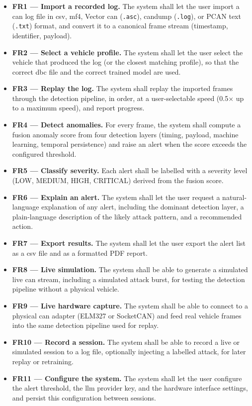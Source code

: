\begin{itemize}
    \item \textbf{FR1 — Import a recorded log.} The system shall let the user import a \gls{can} log file in \gls{csv}, \gls{mf4}, Vector \gls{can} (\texttt{.asc}), candump (\texttt{.log}), or PCAN text (\texttt{.txt}) format, and convert it to a canonical frame stream (timestamp, identifier, payload).
    \item \textbf{FR2 — Select a vehicle profile.} The system shall let the user select the vehicle that produced the log (or the closest matching profile), so that the correct \gls{dbc} file and the correct trained model are used.
    \item \textbf{FR3 — Replay the log.} The system shall replay the imported frames through the detection pipeline, in order, at a user-selectable speed (0.5$\times$ up to a maximum speed), and report progress.
    \item \textbf{FR4 — Detect anomalies.} For every frame, the system shall compute a fusion anomaly score from four detection layers (timing, payload, machine learning, temporal persistence) and raise an alert when the score exceeds the configured threshold.
    \item \textbf{FR5 — Classify severity.} Each alert shall be labelled with a severity level (LOW, MEDIUM, HIGH, CRITICAL) derived from the fusion score.
    \item \textbf{FR6 — Explain an alert.} The system shall let the user request a natural-language explanation of any alert, including the dominant detection layer, a plain-language description of the likely attack pattern, and a recommended action.
    \item \textbf{FR7 — Export results.} The system shall let the user export the alert list as a \gls{csv} file and as a formatted PDF report.
    \item \textbf{FR8 — Live simulation.} The system shall be able to generate a simulated live \gls{can} stream, including a simulated attack burst, for testing the detection pipeline without a physical vehicle.
    \item \textbf{FR9 — Live hardware capture.} The system shall be able to connect to a physical \gls{can} adapter (ELM327 or SocketCAN) and feed real vehicle frames into the same detection pipeline used for replay.
    \item \textbf{FR10 — Record a session.} The system shall be able to record a live or simulated session to a log file, optionally injecting a labelled attack, for later replay or retraining.
    \item \textbf{FR11 — Configure the system.} The system shall let the user configure the alert threshold, the \gls{llm} provider key, and the hardware interface settings, and persist this configuration between sessions.
\end{itemize}

